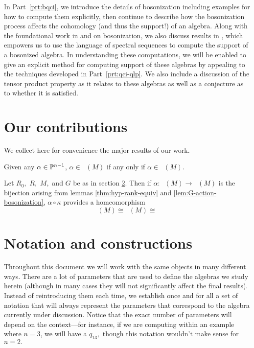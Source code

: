 \documentclass [11pt, proquest] {uwthesis}[2020/02/24]
\DeclareMathOperator{\supphR}{supp^\mathit{hyp}_R}
\DeclareMathOperator{\supphRnaught}{supp^\mathit{hyp}_{R_0}}
\DeclareMathOperator{\suppc}{supp^\mathit{coh}_R}
\DeclareMathOperator{\supprR}{supp^\mathit{rnk}_R}
\DeclareMathOperator{\supprRnaught}{supp^\mathit{rnk}_{R_0}}
\begin{document}
    In Part~\ref{prt:bqci}, we introduce the details of bosonization including examples for how to compute them explicitly, then continue to describe how the bosonization process affects the cohomology (and thus the support!) of an algebra. Along with the foundational work in \cite{radford-product} and \cite{majid-bosonization} on bosonization, we also discuss results in \cite{lorenzlorenz95}, which empowers us to use the language of spectral sequences to compute the support of a bosonized algebra. In understanding these computations, we will be enabled to give an explicit method for computing support of these algebras by appealing to the techniques developed in Part~\ref{prt:qci-qlp}. We also include a discussion of the tensor product property as it relates to these algebras as well as a conjecture as to whether it is satisfied.

\section{Our contributions}
    We collect here for convenience the major results of our work.
    \begingroup
    \def\thethm{3.10}
    \addtocounter{thm}{-1}
    \begin{thm} %
        Given any $\alpha\in\mathbb{P}^{n-1}$, $\alpha\in\supprRnaught(M)$ if any only if $\alpha\in \supphRnaught(M).$
    \end{thm}
    \endgroup
    \begingroup
    \def\thethm{6.7}
    \addtocounter{thm}{-1}
    \begin{thm} %
        Let $R_0,$ $R,$ $M,$ and $G$ be as in section \ref{sec:notation}. Then if $\alpha:\supphR(M)\to \supprR(M)$ is the bijection arising from lemmas \ref{thm:hyp-rank-equiv} and \ref{lem:G-action-bosonization},
        $\alpha\circ\kappa$ provides a homeomorphism
        \[\suppc(M)\cong\supprR(M)\cong\supprRnaught\]
    \end{thm}
    \endgroup

\section{Notation and constructions}\label{sec:notation}
    Throughout this document we will work with the same objects in many different ways. There are a lot of parameters that are used to define the algebras we study herein (although in many cases they will not significantly affect the final results). Instead of reintroducing them each time, we establish once and for all a set of notation that will always represent the parameters that correspond to the algebra currently under discussion. Notice that the exact number of parameters will depend on the context---for instance, if we are computing within an example where $n=3$, we will have a $q_{13},$ though this notation wouldn't make sense for $n=2.$
    
\end{document}
